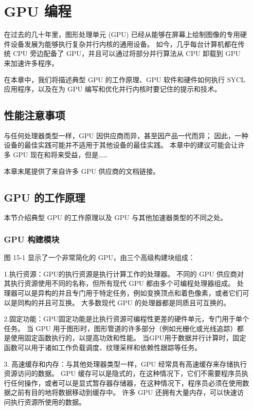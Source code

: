 \section{GPU 编程}
在过去的几十年里，图形处理单元 (GPU) 已经从能够在屏幕上绘制图像的专用硬件设备发展为能够执行复杂并行内核的通用设备。 如今，几乎每台计算机都在传统 CPU 旁边配备了 GPU，并且可以通过将部分并行算法从 CPU 卸载到 GPU 来加速许多程序。

在本章中，我们将描述典型 GPU 的工作原理、GPU 软件和硬件如何执行 SYCL 应用程序，以及在为 GPU 编写和优化并行内核时要记住的提示和技术。

\subsection{性能注意事项}
与任何处理器类型一样，GPU 因供应商而异，甚至因产品一代而异； 因此，一种设备的最佳实践可能并不适用于其他设备的最佳实践。 本章中的建议可能会让许多 GPU 现在和将来受益，但是……

本章末尾提供了来自许多 GPU 供应商的文档链接。

\subsection{GPU 的工作原理}
本节介绍典型 GPU 的工作原理以及 GPU 与其他加速器类型的不同之处。

\subsubsection{GPU 构建模块}
图 15-1 显示了一个非常简化的 GPU，由三个高级构建块组成：

1.执行资源：GPU的执行资源是执行计算工作的处理器。 不同的 GPU 供应商对其执行资源使用不同的名称，但所有现代 GPU 都由多个可编程处理器组成。 处理器可以是异构的并且专门用于特定任务，例如变换顶点和着色像素，或者它们可以是同构的并且可互换。 大多数现代 GPU 的处理器都是同质且可互换的。

2.固定功能：GPU固定功能是比执行资源可编程性更差的硬件单元，专门用于单个任务。 当 GPU 用于图形时，图形管道的许多部分（例如光栅化或光线追踪）都是使用固定函数执行的，以提高功效和性能。 当GPU用于数据并行计算时，固定函数可以用于诸如工作负载调度、纹理采样和依赖性跟踪等任务。

3. 高速缓存和内存：与其他处理器类型一样，GPU 经常具有高速缓存来存储执行资源访问的数据。 GPU 缓存可以是隐式的，在这种情况下，它们不需要程序员执行任何操作，或者可以是显式暂存器存储器，在这种情况下，程序员必须在使用数据之前有目的地将数据移动到缓存中。 许多 GPU 还拥有大量内存，可以快速访问执行资源所使用的数据。

